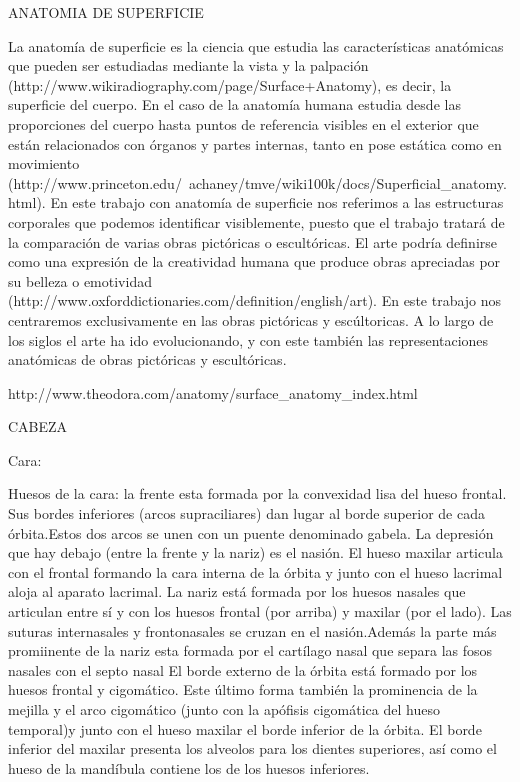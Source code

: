 ANATOMIA DE SUPERFICIE

La anatomía de superficie es la ciencia que estudia las características anatómicas que pueden ser estudiadas mediante la vista y la palpación (http://www.wikiradiography.com/page/Surface+Anatomy), es decir, la superficie del cuerpo. En el caso de la anatomía humana estudia desde las proporciones del cuerpo hasta puntos de referencia visibles en el exterior que están relacionados con órganos y partes internas, tanto en pose estática como en movimiento (http://www.princeton.edu/~achaney/tmve/wiki100k/docs/Superficial_anatomy.html).
En este trabajo con anatomía de superficie nos referimos a las estructuras corporales que podemos identificar visiblemente, puesto que el trabajo tratará de la comparación de varias obras pictóricas o escultóricas.
El arte podría definirse como una expresión de la creatividad humana que produce obras apreciadas por su belleza o emotividad (http://www.oxforddictionaries.com/definition/english/art). En este trabajo nos centraremos exclusivamente en las obras pictóricas y escúltoricas.
A lo largo de los siglos el arte ha ido evolucionando, y con este también las representaciones anatómicas de obras pictóricas y escultóricas.

http://www.theodora.com/anatomy/surface_anatomy_index.html

CABEZA

Cara:

Huesos de la cara: la frente esta formada por la convexidad lisa del hueso frontal. Sus bordes inferiores (arcos supraciliares) dan lugar al borde superior de cada órbita.Estos dos arcos se unen con un puente denominado gabela. La depresión que hay debajo (entre la frente y la nariz) es el nasión.
El hueso maxilar articula con el frontal formando la cara interna de la órbita y junto con el hueso lacrimal aloja al aparato lacrimal.
La nariz  está formada por los huesos nasales que articulan entre sí y con los huesos frontal (por arriba) y maxilar (por el lado). Las suturas internasales y frontonasales se cruzan en el nasión.Además la parte más promiinente de la nariz esta formada por el cartílago nasal que separa las fosos nasales con el septo nasal
El borde externo de la órbita está formado por los huesos frontal y cigomático. Este último forma también la prominencia de la mejilla y el arco cigomático (junto con la apófisis cigomática del hueso temporal)y junto con el hueso maxilar el borde inferior de la órbita.
El borde inferior del maxilar presenta los alveolos para los dientes superiores, así como el hueso de la mandíbula contiene los de los huesos inferiores.

